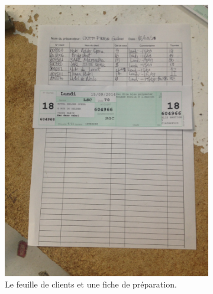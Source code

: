 \documentclass{article}
\newcommand{\rapportFigure}{0.075}
\begin{document}
\FloatBarrier
%
\begin{figure}[h]
    \begin{subfigure}{0.49\textwidth}
        \centering
        \includegraphics[angle=-90,scale= \rapportFigure]{images/fiche_sacs}
        \caption{Le feuille de clients et une fiche de préparation.}
        \label{fig:fiche}
    \end{subfigure}
    ~
    \begin{subfigure}{0.49\textwidth}
        \centering

\end{subfigure}
\end{figure}
\end{document}
